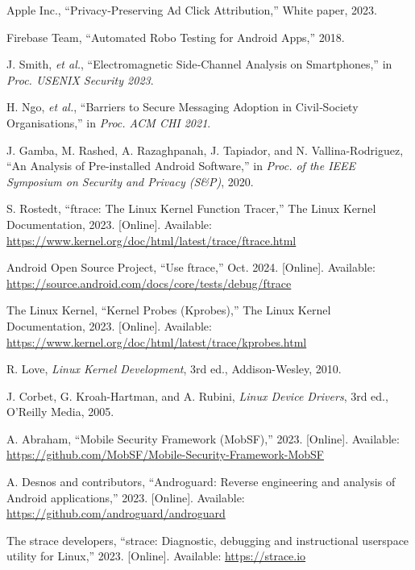 \documentclass[a4paper,12pt]{report}
\begin{document}
\begin{thebibliography}{99}
Apple Inc., “Privacy‑Preserving Ad Click Attribution,” White paper, 2023.

Firebase Team, “Automated Robo Testing for Android Apps,” 2018.

J. Smith, \emph{et al.}, “Electromagnetic Side‑Channel Analysis on Smartphones,” in \emph{Proc. USENIX Security 2023}.

H. Ngo, \emph{et al.}, “Barriers to Secure Messaging Adoption in Civil‑Society Organisations,” in \emph{Proc. ACM CHI 2021}.

J. Gamba, M. Rashed, A. Razaghpanah, J. Tapiador, and N. Vallina-Rodriguez, “An Analysis of Pre-installed Android Software,” in \emph{Proc. of the IEEE Symposium on Security and Privacy (S\&P)}, 2020.

S. Rostedt, “ftrace: The Linux Kernel Function Tracer,” The Linux Kernel Documentation, 2023. [Online]. Available: \url{https://www.kernel.org/doc/html/latest/trace/ftrace.html}

Android Open Source Project, “Use ftrace,” Oct. 2024. [Online]. Available: \url{https://source.android.com/docs/core/tests/debug/ftrace}

The Linux Kernel, “Kernel Probes (Kprobes),” The Linux Kernel Documentation, 2023. [Online]. Available: \url{https://www.kernel.org/doc/html/latest/trace/kprobes.html}

R. Love, \emph{Linux Kernel Development}, 3rd ed., Addison-Wesley, 2010.

J. Corbet, G. Kroah-Hartman, and A. Rubini, \emph{Linux Device Drivers}, 3rd ed., O'Reilly Media, 2005.

A. Abraham, “Mobile Security Framework (MobSF),” 2023. [Online]. Available: \url{https://github.com/MobSF/Mobile-Security-Framework-MobSF}

A. Desnos and contributors, “Androguard: Reverse engineering and analysis of Android applications,” 2023. [Online]. Available: \url{https://github.com/androguard/androguard}

The strace developers, “strace: Diagnostic, debugging and instructional userspace utility for Linux,” 2023. [Online]. Available: \url{https://strace.io}


\end{thebibliography}
\end{document}
